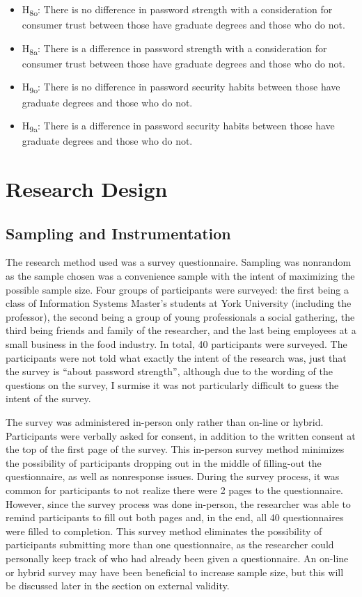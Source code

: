 \documentclass[letterpaper, 10 pt, conference]{ieeeconf}  %
\begin{document}
\begin{itemize}
\item H\textsubscript{8o}: There is no difference in password strength with a consideration for consumer trust between those have graduate degrees and those who do not.
\item H\textsubscript{8a}: There is a difference in password strength with a consideration for consumer trust between those have graduate degrees and those who do not.
\item H\textsubscript{9o}: There is no difference in password security habits between those have graduate degrees and those who do not.
\item H\textsubscript{9a}: There is a difference in password security habits between those have graduate degrees and those who do not.

\end{itemize}


\section{Research Design}

\subsection{Sampling and Instrumentation}

The research method used was a survey questionnaire. Sampling was nonrandom as the sample chosen was a convenience sample with the intent of maximizing the possible sample size. Four groups of participants were surveyed: the first being a class of Information Systems Master’s students at York University (including the professor), the second being a group of young professionals a social gathering, the third being friends and family of the researcher, and the last being employees at a small business in the food industry. In total, 40 participants were surveyed. The participants were not told what exactly the intent of the research was, just that the survey is “about password strength”, although due to the wording of the questions on the survey, I surmise it was not particularly difficult to guess the intent of the survey.

The survey was administered in-person only rather than on-line or hybrid. Participants were verbally asked for consent, in addition to the written consent at the top of the first page of the survey. This in-person survey method minimizes the possibility of participants dropping out in the middle of filling-out the questionnaire, as well as nonresponse issues. During the survey process, it was common for participants to not realize there were 2 pages to the questionnaire. However, since the survey process was done in-person, the researcher was able to remind participants to fill out both pages and, in the end, all 40 questionnaires were filled to completion. This survey method eliminates the possibility of participants submitting more than one questionnaire, as the researcher could personally keep track of who had already been given a questionnaire. An on-line or hybrid survey may have been beneficial to increase sample size, but this will be discussed later in the section on external validity.
\end{document}
